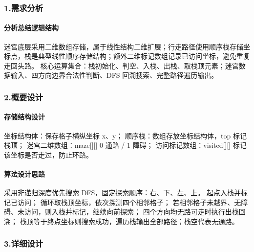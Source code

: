 \documentclass{ctexart}
\begin{document}
\subsubsection {1.需求分析}
\paragraph {分析总结逻辑结构}
迷宫底层采用二维数组存储，属于线性结构二维扩展；行走路径使用顺序栈存储坐标点，栈是典型线性顺序存储结构；额外二维标记数组记录已访问坐标，避免重复走回头路。
核心运算集合：栈初始化、判空、入栈、出栈、取栈顶元素；迷宫数据输入、四方向边界合法性判断、DFS 回溯搜索、完整路径遍历输出。
\subsubsection {2.概要设计}
\paragraph {存储结构设计}
坐标结构体：保存格子横纵坐标 x、y；
顺序栈：数组存放坐标结构体，top 标记栈顶；
迷宫二维数组：maze[][] 0 通路 / 1 障碍；
访问标记数组：visited[][] 标记该坐标是否走过，防止环路。
\paragraph {算法设计思路}
采用非递归深度优先搜索 DFS，固定探索顺序：右、下、左、上。
起点入栈并标记已访问；
循环取栈顶坐标，依次探测四个相邻格子；
若相邻格子未越界、无障碍、未访问，则入栈并标记，继续向前探索；
四个方向均无路可走时执行出栈回溯；
栈顶等于终点坐标则搜索成功，遍历栈输出全部路径；栈空代表无通路。
\subsubsection {3.详细设计}
\end{document}
